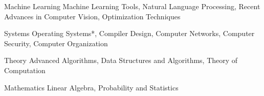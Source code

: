 

\begin{cvskills}

  \cvskill
    {Machine Learning} %
    {Machine Learning Tools,  Natural Language Processing, Recent Advances in Computer Vision, Optimization Techniques} %

  \cvskill
    {Systems} %
    {Operating Systems*, Compiler Design, Computer Networks, Computer Security, Computer Organization} %

  \cvskill
    {Theory} %
    {Advanced Algorithms, Data Structures and Algorithms, Theory of Computation} %
	
	\cvskill
		{Mathematics}
		{Linear Algebra, Probability and Statistics}
\end{cvskills}

